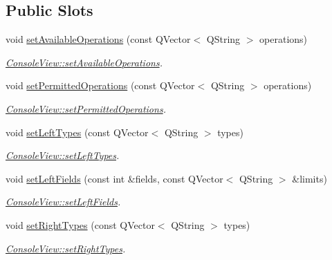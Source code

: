 \subsection*{Public Slots}
\begin{DoxyCompactItemize}
\item 
void \hyperlink{class_console_view_a6d88d3e3957fb1cdea6e076770fffdec}{set\+Available\+Operations} (const Q\+Vector$<$ Q\+String $>$ operations)
\begin{DoxyCompactList}\small\item\em \hyperlink{class_console_view_a6d88d3e3957fb1cdea6e076770fffdec}{Console\+View\+::set\+Available\+Operations}. \end{DoxyCompactList}\item 
void \hyperlink{class_console_view_a17864810f831eb58d8be275a2eaa461d}{set\+Permitted\+Operations} (const Q\+Vector$<$ Q\+String $>$ operations)
\begin{DoxyCompactList}\small\item\em \hyperlink{class_console_view_a17864810f831eb58d8be275a2eaa461d}{Console\+View\+::set\+Permitted\+Operations}. \end{DoxyCompactList}\item 
void \hyperlink{class_console_view_a7dcc84dc917fb81babae471315e9cefd}{set\+Left\+Types} (const Q\+Vector$<$ Q\+String $>$ types)
\begin{DoxyCompactList}\small\item\em \hyperlink{class_console_view_a7dcc84dc917fb81babae471315e9cefd}{Console\+View\+::set\+Left\+Types}. \end{DoxyCompactList}\item 
void \hyperlink{class_console_view_ae813b6a54bc56f1a22b60ee005da813e}{set\+Left\+Fields} (const int \&fields, const Q\+Vector$<$ Q\+String $>$ \&limits)
\begin{DoxyCompactList}\small\item\em \hyperlink{class_console_view_ae813b6a54bc56f1a22b60ee005da813e}{Console\+View\+::set\+Left\+Fields}. \end{DoxyCompactList}\item 
void \hyperlink{class_console_view_a96f03ac06e40ae1d45601ac9f11863c4}{set\+Right\+Types} (const Q\+Vector$<$ Q\+String $>$ types)
\begin{DoxyCompactList}\small\item\em \hyperlink{class_console_view_a96f03ac06e40ae1d45601ac9f11863c4}{Console\+View\+::set\+Right\+Types}. \end{DoxyCompactList}\item 

\end{DoxyCompactItemize}
